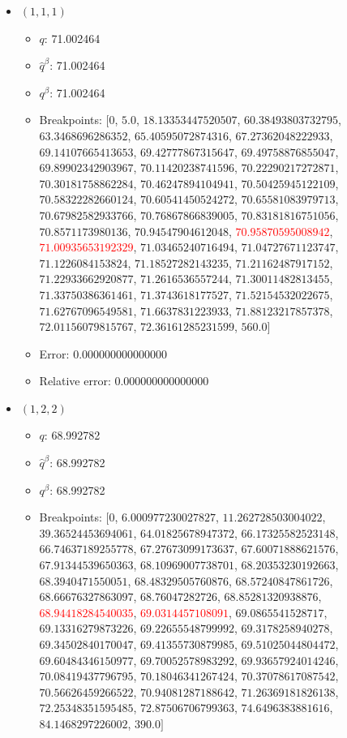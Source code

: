 \documentclass{article}%
\begin{document}
\begin{itemize}%
	\item $(1, 1, 1)$%
	\begin{itemize}%
		\item $q$: 71.002464%
		\item $\hat{q}^\beta$: 71.002464%
		\item $q^\beta$: 71.002464%
		\item Breakpoints: $[$$0$, $5.0$, $18.13353447520507$, $60.38493803732795$, $63.3468696286352$, $65.40595072874316$, $67.27362048222933$, $69.14107665413653$, $69.42777867315647$, $69.49758876855047$, $69.89902342903967$, $70.11420238741596$, $70.22290217272871$, $70.30181758862284$, $70.46247894104941$, $70.50425945122109$, $70.58322282660124$, $70.60541450524272$, $70.65581083979713$, $70.67982582933766$, $70.76867866839005$, $70.83181816751056$, $70.8571173980136$, $70.94547904612048$, \textcolor{red}{$70.95870595008942$}, \textcolor{red}{$71.00935653192329$}, $71.03465240716494$, $71.04727671123747$, $71.1226084153824$, $71.18527282143235$, $71.21162487917152$, $71.22933662920877$, $71.2616536557244$, $71.30011482813455$, $71.33750386361461$, $71.3743618177527$, $71.52154532022675$, $71.62767096549581$, $71.6637831223933$, $71.88123217857378$, $72.01156079815767$, $72.36161285231599$, $560.0$$]$%
		\item Error: 0.000000000000000%
		\item Relative error: 0.000000000000000%
	\end{itemize}%
	\item $(1, 2, 2)$%
	\begin{itemize}%
		\item $q$: 68.992782%
		\item $\hat{q}^\beta$: 68.992782%
		\item $q^\beta$: 68.992782%
		\item Breakpoints: $[$$0$, $6.000977230027827$, $11.262728503004022$, $39.36524453694061$, $64.01825678947372$, $66.17325582523148$, $66.74637189255778$, $67.27673099173637$, $67.60071888621576$, $67.91344539650363$, $68.10969007738701$, $68.20353230192663$, $68.3940471550051$, $68.48329505760876$, $68.57240847861726$, $68.66676327863097$, $68.76047282726$, $68.85281320938876$, \textcolor{red}{$68.94418284540035$}, \textcolor{red}{$69.0314457108091$}, $69.0865541528717$, $69.13316279873226$, $69.22655548799992$, $69.3178258940278$, $69.34502840170047$, $69.41355730879985$, $69.51025044804472$, $69.60484346150977$, $69.70052578983292$, $69.93657924014246$, $70.08419437796795$, $70.18046341267424$, $70.37078617087542$, $70.56626459266522$, $70.94081287188642$, $71.26369181826138$, $72.25348351595485$, $72.87506706799363$, $74.6496383881616$, $84.1468297226002$, $390.0$$]$%

\end{itemize}
\end{itemize}
\end{document}
